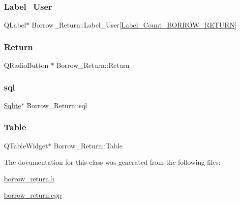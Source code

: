 \subsubsection{\texorpdfstring{Label\_User}{Label\_User}}
{\footnotesize\ttfamily Q\+Label$\ast$ Borrow\+\_\+\+Return\+::\+Label\+\_\+\+User\mbox{[}\mbox{\hyperlink{borrow__return_8h_af38a41a002c7bb91d4bcdd0facb02fbe}{Label\+\_\+\+Count\+\_\+\+B\+O\+R\+R\+O\+W\+\_\+\+R\+E\+T\+U\+RN}}\mbox{]}\hspace{0.3cm}{\ttfamily [private]}}

\mbox{\label{class_borrow___return_aca8210d22b3ccbeec32bb9ede58e2a37}} 
\subsubsection{\texorpdfstring{Return}{Return}}
{\footnotesize\ttfamily Q\+Radio\+Button $\ast$ Borrow\+\_\+\+Return\+::\+Return\hspace{0.3cm}{\ttfamily [private]}}

\mbox{\label{class_borrow___return_acdc2c2126c57e62f2efbb7fae20347c4}} 
\subsubsection{\texorpdfstring{sql}{sql}}
{\footnotesize\ttfamily \mbox{\hyperlink{class_sqlite}{Sqlite}}$\ast$ Borrow\+\_\+\+Return\+::sql\hspace{0.3cm}{\ttfamily [private]}}

\mbox{\label{class_borrow___return_a775ac295d8bdf70bac090e3a4aba5745}} 
\subsubsection{\texorpdfstring{Table}{Table}}
{\footnotesize\ttfamily Q\+Table\+Widget$\ast$ Borrow\+\_\+\+Return\+::\+Table\hspace{0.3cm}{\ttfamily [private]}}



The documentation for this class was generated from the following files\+:\begin{DoxyCompactItemize}
\item 
\mbox{\hyperlink{borrow__return_8h}{borrow\+\_\+return.\+h}}\item 
\mbox{\hyperlink{borrow__return_8cpp}{borrow\+\_\+return.\+cpp}}\end{DoxyCompactItemize}
